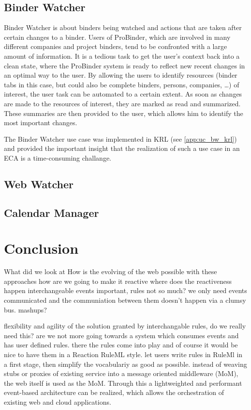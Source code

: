 \documentclass[11pt]{article}%
\begin{document}
\subsection{Binder Watcher}
Binder Watcher is about binders being watched and actions that are taken after certain changes to a binder. Users of ProBinder, which are involved in many different companies and project binders, tend to be confronted with a large amount of information. It is a tedious task to get the user's context back into a clean state, where the ProBinder system is ready to reflect new recent changes in an optimal way to the user. By allowing the users to identify resources (binder tabs in this case, but could also be complete binders, persons, companies, \dots) of interest, the user task can be automated to a certain extent. As soon as changes are made to the resources of interest, they are marked as read and summarized. These summaries are then provided to the user, which allows him to identify the most important changes.

The Binder Watcher use case was implemented in KRL (see \ref{app:uc_bw_krl}) and provided the important insight that the realization of such a use case in an ECA is a time-consuming challange. 

\subsection{Web Watcher}

\subsection{Calendar Manager}


\section{Conclusion}
What did we look at
How is the evolving of the web possible with these approaches
how are we going to make it reactive
where does the reactiveness happen
interchangeable events important, rules not so much?
we only need events communicated and the communiation between them doesn't happen via a clumsy bus.
mashups?


flexibility and agility of the solution granted by interchangable rules, do we really need this?
are we not more going towards a system which consumes events and has user defined rules.
there the rules come into play and of course it would be nice to have them in a Reaction RuleML style.
let users write rules in  RuleMl in a first stage, then simplify the vocabulariy as good as possible.
instead of weaving stubs or proxies of existing service into a message oriented middleware (MoM), the web itself is used as the MoM. Through this a lightweighted and performant event-based architecture can be realized, which allows the orchestration of existing web and cloud applications.
\end{document}
